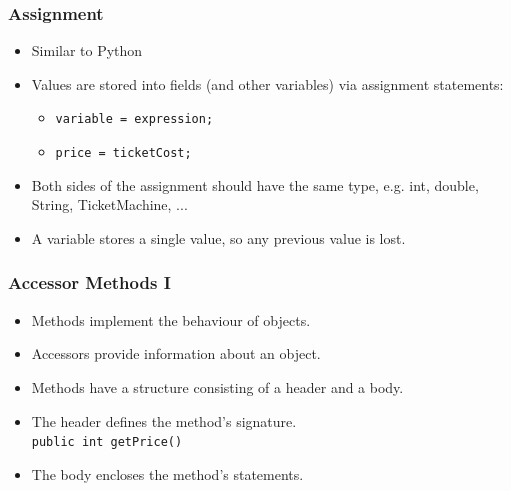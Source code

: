 \begin{frame}[fragile]
\frametitle{Assignment}
\begin{itemize}
\item Similar to Python
\item Values are stored into fields (and other variables) via \alert{assignment} statements:
\begin{itemize}
\item \lstinline!variable = expression;!
\item \lstinline!price = ticketCost;!
\end{itemize}
\item Both sides of the assignment should have the same type, e.g. int, double, String, TicketMachine, ...
\item A variable stores a single value, so any previous value is lost.
\end{itemize}
\end{frame}

\begin{frame}[fragile]
\frametitle{Accessor Methods I}
\begin{itemize}
\item Methods implement the behaviour of objects.
\item Accessors provide information about an object.
\item Methods have a structure consisting of a header and a body.
\item The header defines the \alert{method’s signature}.    \\
\lstinline!public int getPrice()‏!
\item The body encloses the method’s statements.
\end{itemize}
\end{frame}

